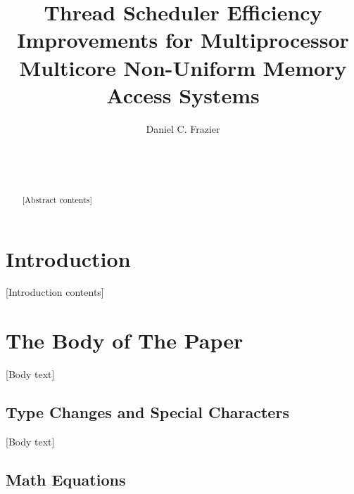 \documentclass{sig-alternate}
\begin{document}

\title{Thread Scheduler Efficiency Improvements for Multiprocessor Multicore Non-Uniform Memory Access Systems}


\author{
\alignauthor
Daniel C. Frazier\\
	\\
	\\
	\\
}

\maketitle
\begin{abstract}
[Abstract contents]
\end{abstract}


\section{Introduction}
\label{sec:introduction}

[Introduction contents]

\section{The {\secit Body} of The Paper}
\label{sec:body}

[Body text]

\subsection{Type Changes and {\subsecit Special} Characters}
\label{sec:typeChangesSpecialChars}

[Body text]

\subsection{Math Equations}
\label{sec:mathEquations}
\end{document}
